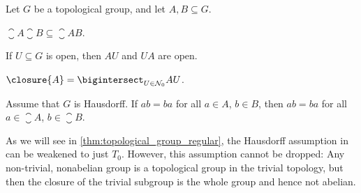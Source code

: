 \documentclass[article, a4paper, 11pt, oneside]{memoir}
\numberwithin{equation}{chapter}
\begin{document}
\begin{proposition}
    Let $G$ be a topological group, and let $A, B \subseteq G$.
    \begin{enumprop}
        \item \label{enum:closure_of_product} $\closure{A} \closure{B} \subseteq \closure{AB}$.

        \item \label{enum:product_open_set} If $U \subseteq G$ is open, then $AU$ and $UA$ are open.

        \item \label{enum:closure-intersection-of-open-sets} $\closure{A} = \bigintersect_{U \in \nhoodfilter{0}} AU$.
        
        \item \label{enum:elements-of-closure-commute} Assume that $G$ is Hausdorff. If $ab = ba$ for all $a \in A$, $b \in B$, then $ab = ba$ for all $a \in \closure{A}$, $b \in \closure{B}$.
    \end{enumprop}
\end{proposition}
%
As we will see in \cref{thm:topological_group_regular}, the Hausdorff assumption in  can be weakened to just $T_0$. However, this assumption cannot be dropped: Any non-trivial, nonabelian group is a topological group in the trivial topology, but then the closure of the trivial subgroup is the whole group and hence not abelian.
\end{document}
